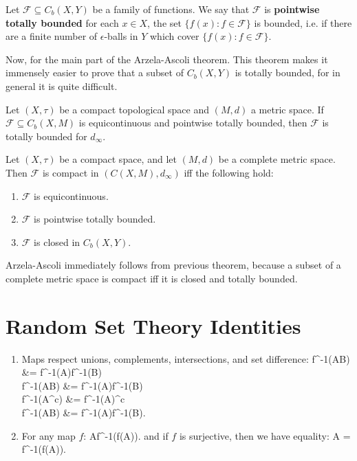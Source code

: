 	\begin{definition}
		Let $\mathcal F\subseteq C_b(X, Y)$ be a family of functions. We say that $\mathcal F$ is \textbf{pointwise 
		totally bounded} for each $x\in X$, the set $\{f(x) : f\in\mathcal F\}$ is bounded, i.e. if there are a finite 
		number of $\epsilon$-balls in $Y$ which cover $\{f(x) : f\in\mathcal F\}$.
	\end{definition}
	
	Now, for the main part of the Arzela-Ascoli theorem. This theorem makes it immensely easier to prove that a 
	subset of $C_b(X, Y)$ is totally bounded, for in general it is quite difficult.
	
	\begin{theorem}
		Let $(X, \tau)$ be a compact topological space and $(M, d)$ a metric space. If $\mathcal F\subseteq C_b(X, M)$ 
		is equicontinuous and pointwise totally bounded, then $\mathcal F$ is totally bounded for $d_\infty$.
	\end{theorem}
	
	\begin{theorem}
		Let $(X, \tau)$ be a compact space, and let $(M, d)$ be a complete metric space. Then $\mathcal F$ is compact in
		$(C(X, M), d_\infty)$ iff the following hold:
		\begin{enumerate}
			\item $\mathcal F$ is equicontinuous.
			\item $\mathcal F$ is pointwise totally bounded.
			\item $\mathcal F$ is closed in $C_b(X, Y)$.
		\end{enumerate}
	\end{theorem}
	
	Arzela-Ascoli immediately follows from previous theorem, because a subset of a complete metric space is compact iff it is 
	closed and totally bounded.

\newpage

\section{Random Set Theory Identities}

	\begin{enumerate}
		\item Maps respect unions, complements, intersections, and set difference:
		\eq
		f^{-1}(A\cup B) &= f^{-1}(A)\cup f^{-1}(B) \\
		f^{-1}(A\cap B) &= f^{-1}(A)\cap f^{-1}(B) \\
		f^{-1}(A^c) &= f^{-1}(A)^c \\
		f^{-1}(A\setminus B) &= f^{-1}(A)\setminus f^{-1}(B).
		\qe
		\item For any map $f$:
		\eq
			A\subseteq f^{-1}(f(A)).
		\qe
		and if $f$ is surjective, then we have equality:
		\eq
			A = f^{-1}(f(A)).
		\qe
	\end{enumerate}


